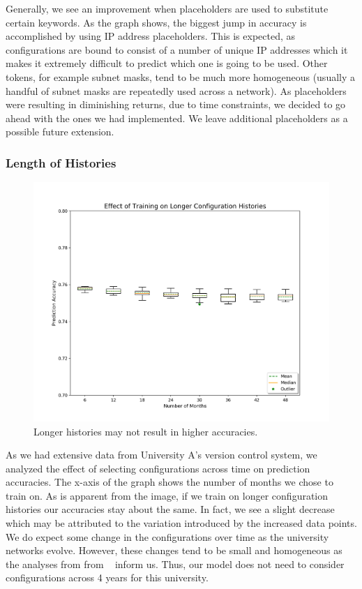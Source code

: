 Generally, we see an improvement when placeholders are used to substitute certain keywords. As the graph shows, the biggest jump in accuracy is accomplished by using IP address placeholders. This is expected, as configurations are bound to consist of a number of unique IP addresses which it makes it extremely difficult to predict which one is going to be used. Other tokens, for example subnet masks, tend to be much more homogeneous (usually a handful of subnet masks are repeatedly used across a network). As placeholders were resulting in diminishing returns, due to time constraints, we decided to go ahead with the ones we had implemented. We leave additional placeholders as a possible future extension.


\subsubsection{Length of Histories}

\begin{figure}[H]
	\centering
	\includegraphics[width=\textwidth]{time.png}
	\caption{Longer histories may not result in higher accuracies.}
\end{figure}

As we had extensive data from University A's version control system, we analyzed the effect of selecting configurations across time on prediction accuracies. The x-axis of the graph shows the number of months we chose to train on. As is apparent from the image, if we train on longer configuration histories our accuracies stay about the same. In fact, we see a slight decrease which may be attributed to the variation introduced by the increased data points. We do expect some change in the configurations over time as the university networks evolve. However, these changes tend to be small and homogeneous as the analyses from from ~\cite{Kim} inform us. Thus, our model does not need to consider configurations across 4 years for this university.

